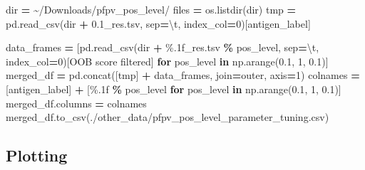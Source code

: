 \documentclass[
  11pt,
  oneside]{book}
\newenvironment{Shaded}{\begin{snugshade}}{\end{snugshade}}
\newcommand{\BuiltInTok}[1]{#1}
\newcommand{\CharTok}[1]{\textcolor[rgb]{0.31,0.60,0.02}{#1}}
\newcommand{\ControlFlowTok}[1]{\textcolor[rgb]{0.13,0.29,0.53}{\textbf{#1}}}
\newcommand{\DecValTok}[1]{\textcolor[rgb]{0.00,0.00,0.81}{#1}}
\newcommand{\FloatTok}[1]{\textcolor[rgb]{0.00,0.00,0.81}{#1}}
\newcommand{\KeywordTok}[1]{\textcolor[rgb]{0.13,0.29,0.53}{\textbf{#1}}}
\newcommand{\NormalTok}[1]{#1}
\newcommand{\OperatorTok}[1]{\textcolor[rgb]{0.81,0.36,0.00}{\textbf{#1}}}
\newcommand{\SpecialCharTok}[1]{\textcolor[rgb]{0.00,0.00,0.00}{#1}}
\newcommand{\StringTok}[1]{\textcolor[rgb]{0.31,0.60,0.02}{#1}}
\begin{document}
\begin{Shaded}
\begin{Highlighting}[]
\BuiltInTok{dir} \OperatorTok{=} \StringTok{\textquotesingle{}\textasciitilde{}/Downloads/pfpv\_pos\_level/\textquotesingle{}}
\NormalTok{files }\OperatorTok{=}\NormalTok{ os.listdir(}\BuiltInTok{dir}\NormalTok{)}
\NormalTok{tmp }\OperatorTok{=}\NormalTok{ pd.read\_csv(}\BuiltInTok{dir} \OperatorTok{+} \StringTok{\textquotesingle{}0.1\_res.tsv\textquotesingle{}}\NormalTok{, sep}\OperatorTok{=}\StringTok{\textquotesingle{}}\CharTok{\textbackslash{}t}\StringTok{\textquotesingle{}}\NormalTok{, index\_col}\OperatorTok{=}\DecValTok{0}\NormalTok{)[}\StringTok{\textquotesingle{}antigen\_label\textquotesingle{}}\NormalTok{]}

\NormalTok{data\_frames }\OperatorTok{=}\NormalTok{ [pd.read\_csv(}\BuiltInTok{dir} \OperatorTok{+} \StringTok{\textquotesingle{}}\SpecialCharTok{\%.1f}\StringTok{\_res.tsv\textquotesingle{}} \OperatorTok{\%}\NormalTok{ pos\_level, sep}\OperatorTok{=}\StringTok{\textquotesingle{}}\CharTok{\textbackslash{}t}\StringTok{\textquotesingle{}}\NormalTok{, index\_col}\OperatorTok{=}\DecValTok{0}\NormalTok{)[}\StringTok{\textquotesingle{}OOB score filtered\textquotesingle{}}\NormalTok{] }\ControlFlowTok{for}\NormalTok{ pos\_level }\KeywordTok{in}\NormalTok{ np.arange(}\FloatTok{0.1}\NormalTok{, }\DecValTok{1}\NormalTok{, }\FloatTok{0.1}\NormalTok{)]}
\NormalTok{merged\_df }\OperatorTok{=}\NormalTok{ pd.concat([tmp] }\OperatorTok{+}\NormalTok{ data\_frames, join}\OperatorTok{=}\StringTok{\textquotesingle{}outer\textquotesingle{}}\NormalTok{, axis}\OperatorTok{=}\DecValTok{1}\NormalTok{)}
\NormalTok{colnames }\OperatorTok{=}\NormalTok{ [}\StringTok{\textquotesingle{}antigen\_label\textquotesingle{}}\NormalTok{] }\OperatorTok{+}\NormalTok{ [}\StringTok{\textquotesingle{}}\SpecialCharTok{\%.1f}\StringTok{\textquotesingle{}} \OperatorTok{\%}\NormalTok{ pos\_level }\ControlFlowTok{for}\NormalTok{ pos\_level }\KeywordTok{in}\NormalTok{ np.arange(}\FloatTok{0.1}\NormalTok{, }\DecValTok{1}\NormalTok{, }\FloatTok{0.1}\NormalTok{)]}
\NormalTok{merged\_df.columns }\OperatorTok{=}\NormalTok{ colnames}
\NormalTok{merged\_df.to\_csv(}\StringTok{\textquotesingle{}./other\_data/pfpv\_pos\_level\_parameter\_tuning.csv\textquotesingle{}}\NormalTok{)}
\end{Highlighting}
\end{Shaded}

\hypertarget{plotting}{%
\subsection{Plotting}\label{plotting}}
\end{document}
